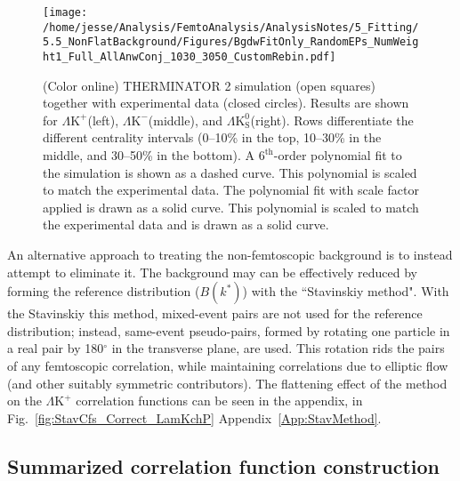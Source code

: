 \documentclass[ALICE,manyauthors]{cernphprep}
\newcommand{\LamKchP}{$\Lambda\mathrm{K^{+}}$\xspace}
\newcommand{\LamKchM}{$\Lambda\mathrm{K^{-}}$\xspace}
\newcommand{\LamKs}{$\Lambda\mathrm{K^{0}_{S}}$\xspace}
\begin{document}
\begin{figure}[h]
  \centering
  \texttt{[image: /home/jesse/Analysis/FemtoAnalysis/AnalysisNotes/5\_Fitting/5.5\_NonFlatBackground/Figures/BgdwFitOnly\_RandomEPs\_NumWeight1\_Full\_AllAnwConj\_1030\_3050\_CustomRebin.pdf]}
  \caption[Backgrounds with THERMINATOR 2]
  {
  (Color online) THERMINATOR 2 simulation (open squares) together with experimental data (closed circles).  
  Results are shown for \LamKchP (left), \LamKchM (middle), and \LamKs (right).
  {\color{blue}Rows differentiate the different centrality intervals (0--10\% in the top, 10--30\% in the middle, and 30--50\% in the bottom).}
  A $6^{\mathrm{th}}$-order polynomial fit to the simulation is shown as a dashed curve.  
  {\color{red}This polynomial is scaled to match the experimental data.  
  The polynomial fit with scale factor applied is drawn as a solid curve.}
  {\color{blue}This polynomial is scaled to match the experimental data and is drawn as a solid curve.}
  }
  \label{fig:BgdswTHERM}
\end{figure} 


An alternative approach to treating the non-femtoscopic background is to instead attempt to eliminate it.
The background {\color{red}may} {\color{blue}can} be effectively reduced by forming the reference distribution ($B(k^{*})$) with the ``Stavinskiy method".
With {\color{red}the Stavinskiy} {\color{blue}this} method, mixed-event pairs are not used for the reference distribution; instead, same-event pseudo-pairs, formed by rotating one particle in a real pair by 180$^\circ$ in the transverse plane, are used.  
This rotation rids the pairs of any femtoscopic correlation, while maintaining correlations due to elliptic flow (and other suitably symmetric contributors).
The flattening effect of the method on the \LamKchP correlation functions can be seen in the {\color{red}appendix, in Fig.~\ref{fig:StavCfs_Correct_LamKchP}} {\color{blue}Appendix~\ref{App:StavMethod}}.

\subsection{Summarized correlation function construction}
\label{SummarizedFitProcedure}
\end{document}
